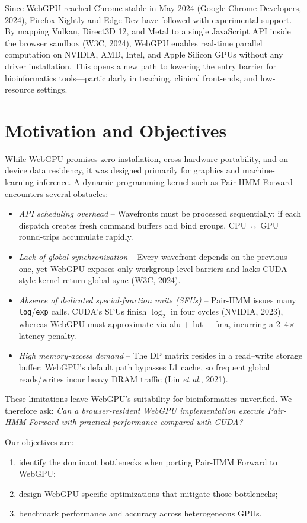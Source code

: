 \documentclass[PhD]{PHlab-thesis}
\begin{document}
Since WebGPU reached Chrome stable in May 2024 (Google Chrome Developers, 2024), Firefox Nightly and Edge Dev have followed with experimental support. By mapping Vulkan, Direct3D 12, and Metal to a single JavaScript API inside the browser sandbox (W3C, 2024), WebGPU enables real-time parallel computation on NVIDIA, AMD, Intel, and Apple Silicon GPUs without any driver installation. This opens a new path to lowering the entry barrier for bioinformatics tools—particularly in teaching, clinical front-ends, and low-resource settings.

\section{Motivation and Objectives}
While WebGPU promises zero installation, cross-hardware portability, and on-device data residency, it was designed primarily for graphics and machine-learning inference. A dynamic-programming kernel such as Pair-HMM Forward encounters several obstacles:

\begin{itemize}
  \item \textit{API scheduling overhead} – Wavefronts must be processed sequentially; if each dispatch creates fresh command buffers and bind groups, CPU ↔ GPU round-trips accumulate rapidly.
  \item \textit{Lack of global synchronization} – Every wavefront depends on the previous one, yet WebGPU exposes only workgroup-level barriers and lacks CUDA-style kernel-return global sync (W3C, 2024).
  \item \textit{Absence of dedicated special-function units (SFUs)} – Pair-HMM issues many \texttt{log}/\texttt{exp} calls. CUDA's SFUs finish $\log_{2}$ in four cycles (NVIDIA, 2023), whereas WebGPU must approximate via alu + lut + fma, incurring a 2–4$\times$ latency penalty.
  \item \textit{High memory-access demand} – The DP matrix resides in a read–write storage buffer; WebGPU's default path bypasses L1 cache, so frequent global reads/writes incur heavy DRAM traffic (Liu \emph{et al}., 2021).
\end{itemize}

These limitations leave WebGPU's suitability for bioinformatics unverified. We therefore ask: \textit{Can a browser-resident WebGPU implementation execute Pair-HMM Forward with practical performance compared with CUDA?}

Our objectives are:
\begin{enumerate}
  \item identify the dominant bottlenecks when porting Pair-HMM Forward to WebGPU;
  \item design WebGPU-specific optimizations that mitigate those bottlenecks;
  \item benchmark performance and accuracy across heterogeneous GPUs.
\end{enumerate}
\end{document}
